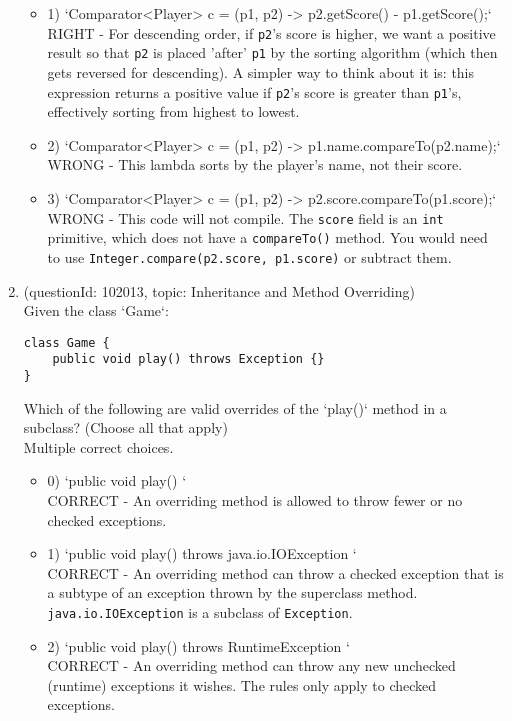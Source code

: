 \documentclass[12pt]{article}
\begin{document}
\begin{enumerate}[label=(\arabic*)]
\begin{itemize}
\item 1) `Comparator<Player> c = (p1, p2) -> p2.getScore() - p1.getScore();`
 \\ 
RIGHT - For descending order, if \verb|p2|'s score is higher, we want a positive result so that \verb|p2| is placed 'after' \verb|p1| by the sorting algorithm (which then gets reversed for descending). A simpler way to think about it is: this expression returns a positive value if \verb|p2|'s score is greater than \verb|p1|'s, effectively sorting from highest to lowest.

\item 2) `Comparator<Player> c = (p1, p2) -> p1.name.compareTo(p2.name);`
 \\ 
WRONG - This lambda sorts by the player's name, not their score.

\item 3) `Comparator<Player> c = (p1, p2) -> p2.score.compareTo(p1.score);`
 \\ 
WRONG - This code will not compile. The \verb|score| field is an \verb|int| primitive, which does not have a \verb|compareTo()| method. You would need to use \verb|Integer.compare(p2.score, p1.score)| or subtract them.

\end{itemize}
\item (questionId: 102013, topic: Inheritance and Method Overriding) \\ 
Given the class `Game`:
\begin{verbatim}
class Game {
    public void play() throws Exception {}
}
\end{verbatim}
Which of the following are valid overrides of the `play()` method in a subclass? (Choose all that apply)
\\ \noindent Multiple correct choices. 
\begin{itemize}
\item 0) `public void play() {}`
 \\ 
CORRECT - An overriding method is allowed to throw fewer or no checked exceptions.

\item 1) `public void play() throws java.io.IOException {}`
 \\ 
CORRECT - An overriding method can throw a checked exception that is a subtype of an exception thrown by the superclass method. \verb|java.io.IOException| is a subclass of \verb|Exception|.

\item 2) `public void play() throws RuntimeException {}`
 \\ 
CORRECT - An overriding method can throw any new unchecked (runtime) exceptions it wishes. The rules only apply to checked exceptions.


\end{itemize}
\end{enumerate}
\end{document}
